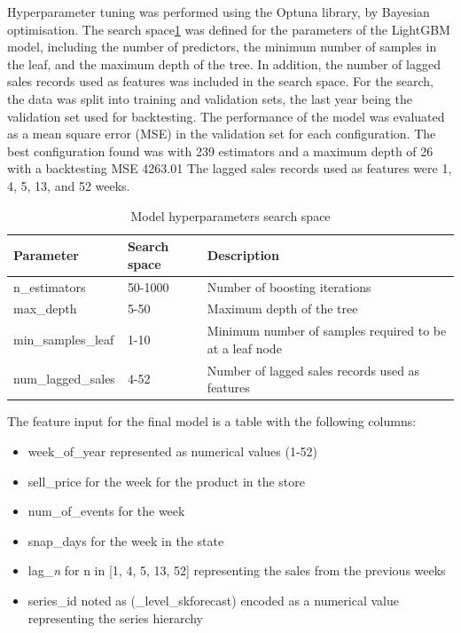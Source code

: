 Hyperparameter tuning was performed using the Optuna library\cite{optuna_2019}, by Bayesian optimisation.
The search space\ref{tab:hyperparam_search_space} was defined for the parameters of the LightGBM model, including the number of predictors, the minimum number of samples in the leaf, and the maximum depth of the tree.
In addition, the number of lagged sales records used as features was included in the search space.
For the search, the data was split into training and validation sets, the last year being the validation set used for backtesting.
The performance of the model was evaluated as a mean square error (MSE) in the validation set for each configuration.
The best configuration found was with 239 estimators and a maximum depth of 26 with a backtesting MSE 4263.01
The lagged sales records used as features were 1, 4, 5, 13, and 52 weeks.
\begin{table}
    \centering
    \begin{tabular}{|l|l|l|}
        \hline
        Parameter          & Search space & Description                                             \\
        \hline
        n\_estimators      & 50-1000      & Number of boosting iterations                           \\
        max\_depth         & 5-50         & Maximum depth of the tree                               \\
        min\_samples\_leaf & 1-10         & Minimum number of samples required to be at a leaf node \\
        num\_lagged\_sales & 4-52         & Number of lagged sales records used as features         \\
        \hline
    \end{tabular}
    \caption{Model hyperparameters search space}
    \label{tab:hyperparam_search_space}
\end{table}

The feature input for the final model is a table with the following columns:
\begin{itemize}
    \item week\_of\_year represented as numerical values (1-52)
    \item sell\_price for the week for the product in the store
    \item num\_of\_events for the week
    \item snap\_days for the week in the state
    \item lag\_\emph{n} for n in [1, 4, 5, 13, 52] representing the sales from the previous weeks
    \item series\_id noted as (\_level\_skforecast) encoded as a numerical value representing the series hierarchy
\end{itemize}
